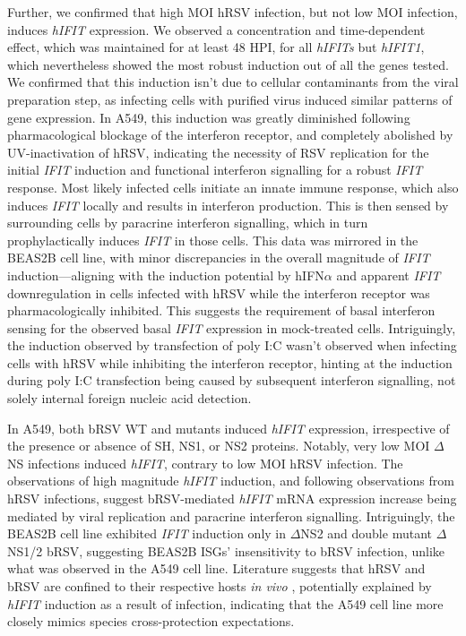 Further, we confirmed that high MOI hRSV infection, but not low MOI infection, induces \textit{hIFIT} expression. We observed a concentration and time-dependent effect, which was maintained for at least 48 HPI, for all \textit{hIFITs} but \textit{hIFIT1}, which nevertheless showed the most robust induction out of all the genes tested. We confirmed that this induction isn't due to cellular contaminants from the viral preparation step, as infecting cells with purified virus induced similar patterns of gene expression.  In A549, this induction was greatly diminished following pharmacological blockage of the interferon receptor, and completely abolished by UV-inactivation of hRSV, indicating the necessity of RSV replication for the initial \textit{IFIT} induction and functional interferon signalling for a robust \textit{IFIT} response. Most likely infected cells initiate an innate immune response, which also induces \textit{IFIT} locally and results in interferon production. This is then sensed by surrounding cells by paracrine interferon signalling, which in turn prophylactically induces \textit{IFIT} in those cells. This data was mirrored in the BEAS2B cell line, with minor discrepancies in the overall magnitude of \textit{IFIT} induction—aligning with the induction potential by hIFN$\alpha$ and apparent \textit{IFIT} downregulation in cells infected with hRSV while the interferon receptor was pharmacologically inhibited. This suggests the requirement of basal interferon sensing for the observed basal \textit{IFIT} expression in mock-treated cells. Intriguingly, the induction observed by transfection of poly I:C wasn't observed when infecting cells with hRSV while inhibiting the interferon receptor, hinting at the induction during poly I:C transfection being caused by subsequent interferon signalling, not solely internal foreign nucleic acid detection.

In A549, both bRSV WT and mutants induced \textit{hIFIT} expression, irrespective of the presence or absence of SH, NS1, or NS2 proteins. Notably, very low MOI $\Delta$NS infections induced \textit{hIFIT}, contrary to low MOI hRSV infection. The observations of high magnitude \textit{hIFIT} induction, and following observations from hRSV infections, suggest bRSV-mediated \textit{hIFIT} mRNA expression increase being mediated by viral replication and paracrine interferon signalling. Intriguingly, the BEAS2B cell line exhibited \textit{IFIT} induction only in $\Delta$NS2 and double mutant $\Delta$NS1/2 bRSV, suggesting BEAS2B ISGs' insensitivity to bRSV infection, unlike what was observed in the A549 cell line. Literature suggests that hRSV and bRSV are confined to their respective hosts \textit{in vivo} \cite{Buchholz2000ChimericVaccine}, potentially explained by \textit{hIFIT} induction as a result of infection, indicating that the A549 cell line more closely mimics species cross-protection expectations.

